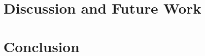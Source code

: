 \documentclass[preprint,journal]{vgtc}       %
\begin{document}
\section{Discussion and Future Work}
  \label{sec:discussion}
  

\section{Conclusion}
  \label{sec:conclusion}
  


%
%
%
%



%   
\end{document}
